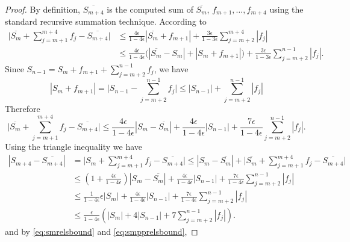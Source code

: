 \begin{proof}
      By definition, $\overline{S_{m+4}}$ is the computed sum of
      $\overline{S_m}$, $f_{m+1}, \ldots, f_{m+4}$ using the standard recursive summation technique.
      According to \cite[Equation 1.2, 2.4]{higham}
      \begin{align*}
          \bigl|\overline{S_m} + \sum_{j=m+1}^{m+4}f_j - \overline{S_{m+4}}\bigr|
          & \leq \frac{4\epsilon}{1-4\epsilon} \left|\overline{S_m} + f_{m+1}\right| + \frac{3\epsilon}{1-3\epsilon} \sum_{j=m+2}^{m+4}|f_j| \\
          & \leq \frac{4\epsilon}{1-4\epsilon} \bigl(\left|\overline{S_m} - S_m\right| + |S_m + f_{m+1}|\bigr)
              + \frac{3\epsilon}{1-3\epsilon} \sum_{j=m+2}^{n-1}|f_j|.
      \end{align*}
      Since $S_{n-1} = S_m + f_{m+1} + \sum_{j=m+2}^{n-1} f_j$, we have
      \begin{equation*}
          |S_m + f_{m+1}|
          = \bigl|S_{n-1} - \sum_{j=m+2}^{n-1}f_j\bigr|
          \leq |S_{n-1}| + \sum_{j=m+2}^{n-1} |f_j|
      \end{equation*}
      Therefore
      \begin{equation*}
          \bigl|\overline{S_m} + \sum_{j=m+1}^{m+4}f_j - \overline{S_{m+4}}\bigr|
          \leq \frac{4\epsilon}{1-4\epsilon} \left|S_m - \overline{S_m}\right|
          + \frac{4\epsilon}{1-4\epsilon} |S_{n-1}|
          + \frac{7\epsilon}{1-4\epsilon} \sum_{j=m+2}^{n-1}|f_j|.
      \end{equation*}
      Using the triangle inequality we have
      \begin{align*}
      \left|S_{m+4} - \overline{S_{m+4}}\right|
          & = \bigl|S_m + \sum_{j=m+1}^{m+4}f_j - \overline{S_{m+4}}\bigr|
          \leq \left|S_m - \overline{S_m} \right| + \bigl|\overline{S_m} + \sum_{j=m+1}^{m+4}f_j - \overline{S_{m+4}} \bigr| \\
          & \leq \left(1 + \frac{4\epsilon}{1-4\epsilon}\right) \left|S_m - \overline{S_m}\right| + \frac{4\epsilon}{1-4\epsilon} |S_{n-1}|
                  + \frac{7\epsilon}{1-4\epsilon} \sum_{j=m+2}^{n-1}|f_j| \\
          & \leq \frac{1}{1-4\epsilon} \epsilon |S_m| + \frac{4\epsilon}{1-4\epsilon} |S_{n-1}|
                  + \frac{7\epsilon}{1-4\epsilon} \sum_{j=m+2}^{n-1}|f_j| \\
          & \leq \frac{\epsilon}{1-4\epsilon} \left(|S_m| + 4 |S_{n-1}|
                  + 7 \sum_{j=m+2}^{n-1}|f_j|\right).
      \end{align*}
      and by \eqref{eq:smrelsbound} and \eqref{eq:smpprelsbound},

\end{proof}
